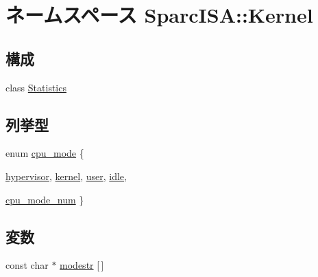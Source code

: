\hypertarget{namespaceSparcISA_1_1Kernel}{
\section{ネームスペース SparcISA::Kernel}
\label{namespaceSparcISA_1_1Kernel}
}
\subsection*{構成}
\begin{DoxyCompactItemize}
\item 
class \hyperlink{classSparcISA_1_1Kernel_1_1Statistics}{Statistics}
\end{DoxyCompactItemize}
\subsection*{列挙型}
\begin{DoxyCompactItemize}
\item 
enum \hyperlink{namespaceSparcISA_1_1Kernel_aa1fc3805dac6f71f457fbbc263105bf6}{cpu\_\-mode} \{ \par
\hyperlink{namespaceSparcISA_1_1Kernel_aa1fc3805dac6f71f457fbbc263105bf6a91b640fcbd5e0f6c8310b554caa00d4b}{hypervisor}, 
\hyperlink{namespaceSparcISA_1_1Kernel_aa1fc3805dac6f71f457fbbc263105bf6adb0339d028e596254368234e5ab09f9d}{kernel}, 
\hyperlink{namespaceSparcISA_1_1Kernel_aa1fc3805dac6f71f457fbbc263105bf6a04981b8c09a50ccfb1d92fc11b81c36a}{user}, 
\hyperlink{namespaceSparcISA_1_1Kernel_aa1fc3805dac6f71f457fbbc263105bf6a0e9a37114c0e458d28d52f06ec0f2242}{idle}, 
\par
\hyperlink{namespaceSparcISA_1_1Kernel_aa1fc3805dac6f71f457fbbc263105bf6a4572f7cf10830e04921c8896f22102ba}{cpu\_\-mode\_\-num}
 \}
\end{DoxyCompactItemize}
\subsection*{変数}
\begin{DoxyCompactItemize}
\item 
const char $\ast$ \hyperlink{namespaceSparcISA_1_1Kernel_aaab5092bc6d1c40a90ff4c7450649ace}{modestr} \mbox{[}$\,$\mbox{]}
\end{DoxyCompactItemize}


